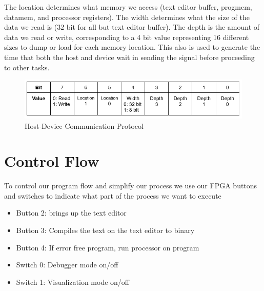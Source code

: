 \documentclass[conference]{IEEEtran}
\begin{document}
The location determines what memory we access (text editor buffer, progmem, datamem, and processor registers). The width determines what the size of the data we read is (32 bit for all but text editor buffer). The depth is the amount of data we read or write, corresponding to a 4 bit value representing 16 different sizes to dump or load for each memory location. This also is used to generate the time that both the host and device wait in sending the signal before proceeding to other tasks.


\begin{figure}
    \centering
    \includegraphics[width=1\linewidth]{protocol.png}
    \caption{Host-Device Communication Protocol}
    \label{fig:enter-label}
\end{figure}


\section{Control Flow}
To control our program flow and simplify our process we use our FPGA buttons and switches to indicate what part of the process we want to execute

\begin{itemize}
    \item Button 2: brings up the text editor
    \item Button 3: Compiles the text on the text editor to binary 
    \item Button 4: If error free program, run processor on program 
    \item Switch 0: Debugger mode on/off
    \item Switch 1: Visualization mode on/off
\end{itemize}
\end{document}
